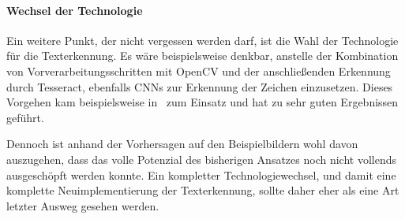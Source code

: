 \paragraph{Wechsel der Technologie}

Ein weitere Punkt, der nicht vergessen werden darf, ist die Wahl der
Technologie f\"ur die Texterkennung.
Es w\"are beispielsweise denkbar, anstelle der Kombination von
Vorverarbeitungsschritten mit OpenCV und der anschlie{\ss}enden
Erkennung durch Tesseract, ebenfalls CNNs zur Erkennung der
Zeichen einzusetzen.
Dieses Vorgehen kam beispielsweise in~\cite{silva2018a} zum Einsatz und
hat zu sehr guten Ergebnissen gef\"uhrt.

Dennoch ist anhand der Vorhersagen auf den Beispielbildern
wohl davon auszugehen, dass das volle Potenzial des bisherigen
Ansatzes noch nicht vollends ausgesch\"opft werden konnte.
Ein kompletter Technologiewechsel, und damit eine komplette
Neuimplementierung der Texterkennung, sollte daher eher als eine
Art letzter Ausweg gesehen werden.
